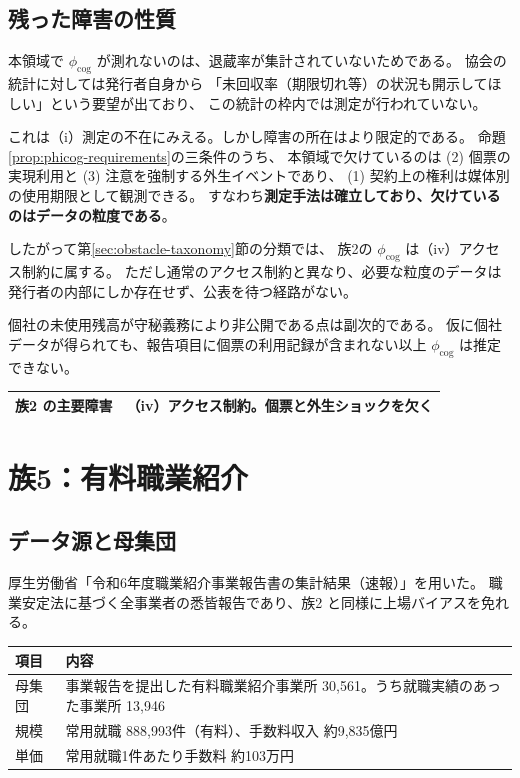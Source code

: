 \subsection{残った障害の性質}

本領域で $\phi_{\mathrm{cog}}$ が測れないのは、退蔵率が集計されていないためである。
協会の統計に対しては発行者自身から
「未回収率（期限切れ等）の状況も開示してほしい」という要望が出ており、
この統計の枠内では測定が行われていない。

これは（i）測定の不在にみえる。しかし障害の所在はより限定的である。
命題\ref{prop:phicog-requirements}の三条件のうち、
本領域で欠けているのは (2) 個票の実現利用と (3) 注意を強制する外生イベントであり、
(1) 契約上の権利は媒体別の使用期限として観測できる。
すなわち\textbf{測定手法は確立しており、欠けているのはデータの粒度である}。

したがって第\ref{sec:obstacle-taxonomy}節の分類では、
族2の $\phi_{\mathrm{cog}}$ は（iv）アクセス制約に属する。
ただし通常のアクセス制約と異なり、必要な粒度のデータは
発行者の内部にしか存在せず、公表を待つ経路がない。

個社の未使用残高が守秘義務により非公開である点は副次的である。
仮に個社データが得られても、報告項目に個票の利用記録が含まれない以上
$\phi_{\mathrm{cog}}$ は推定できない。

\begin{center}
\begin{tabularx}{\textwidth}{@{}lX@{}}
\toprule
族2 の主要障害 & （iv）アクセス制約。個票と外生ショックを欠く \\
\bottomrule
\end{tabularx}
\label{tab:family2-obstacle}
\end{center}


\section{族5：有料職業紹介}

\subsection{データ源と母集団}

厚生労働省「令和6年度職業紹介事業報告書の集計結果（速報）」を用いた。
職業安定法に基づく全事業者の悉皆報告であり、族2 と同様に上場バイアスを免れる。

\begin{center}
\begin{tabularx}{\textwidth}{@{}lX@{}}
\toprule
項目 & 内容 \\
\midrule
母集団 & 事業報告を提出した有料職業紹介事業所 30,561。うち就職実績のあった事業所 13,946 \\
規模 & 常用就職 888,993件（有料）、手数料収入 約9,835億円 \\
単価 & 常用就職1件あたり手数料 約103万円 \\
\bottomrule
\end{tabularx}
\label{tab:family5-data-source}
\end{center}

